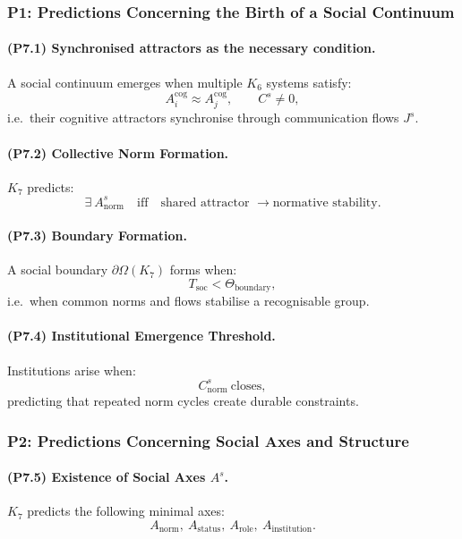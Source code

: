 \subsubsection{P1: Predictions Concerning the Birth of a Social Continuum}

\paragraph{(P7.1) Synchronised attractors as the necessary condition.}
A social continuum emerges when multiple $K_6$ systems satisfy:
\[
A_i^{\mathrm{cog}} \approx A_j^{\mathrm{cog}},
\qquad
C^s \neq 0,
\]
i.e.\ their cognitive attractors synchronise through communication flows $J^s$.

\paragraph{(P7.2) Collective Norm Formation.}
$K_7$ predicts:
\[
\exists \ A_{\mathrm{norm}}^s \quad \text{iff} \quad 
\text{shared attractor } \to \text{normative stability}.
\]

\paragraph{(P7.3) Boundary Formation.}
A social boundary $\partial\Omega(K_7)$ forms when:
\[
T_{\mathrm{soc}} < \Theta_{\mathrm{boundary}},
\]
i.e.\ when common norms and flows stabilise a recognisable group.

\paragraph{(P7.4) Institutional Emergence Threshold.}
Institutions arise when:
\[
C_{\mathrm{norm}}^s \ \text{closes},
\]
predicting that repeated norm cycles create durable constraints.

\subsubsection{P2: Predictions Concerning Social Axes and Structure}

\paragraph{(P7.5) Existence of Social Axes \texorpdfstring{$A^s$}{A^s}.}
$K_7$ predicts the following minimal axes:
\[
A_{\mathrm{norm}}, \ 
A_{\mathrm{status}},\
A_{\mathrm{role}}, \
A_{\mathrm{institution}}.
\]

